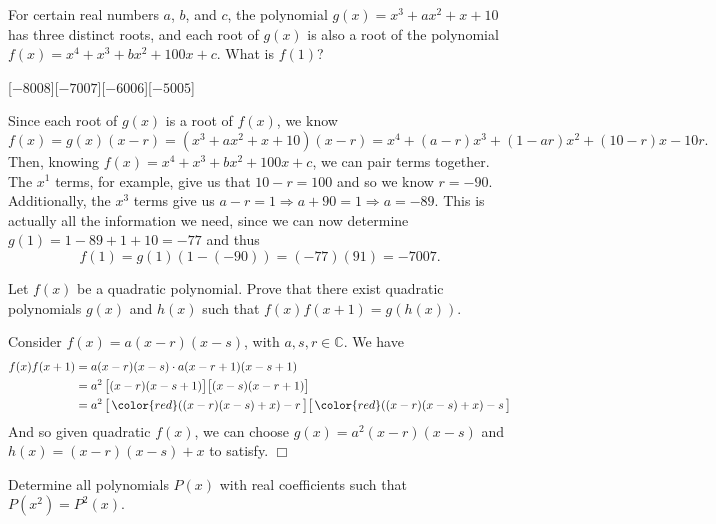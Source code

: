 \begin{problem}[A][5][AMC 12A 2017/23]
    For certain real numbers \( a \), \( b \), and \( c \), the polynomial
    \( g(x) = x^3 + ax^2 + x + 10 \)
    has three distinct roots, and each root of \( g(x) \) is also a root of the polynomial
    \( f(x) = x^4 + x^3 + bx^2 + 100x + c. \)
    What is \( f(1) \)?
\end{problem}
[$-8008$][$-7007$][$-6006$][$-5005$]

\begin{solution}[C]
    Since each root of $g(x)$ is a root of $f(x)$, we know
    \[
        f(x)=g(x)(x-r)=(x^3 + ax^2 + x + 10)(x-r)=x^4+(a-r)x^3+(1-ar)x^2+(10-r)x-10r.
    \]
    Then, knowing $f(x)=x^4 + x^3 + bx^2 + 100x + c$, we can pair terms together. The $x^1$ terms, for example, give us that $10-r=100$ and so we know $r=-90$. Additionally, the $x^3$ terms give us $a-r=1 \Rightarrow a+90=1 \Rightarrow a=-89$. This is actually all the information we need, since we can now determine $g(1)=1-89+1+10=-77$ and thus
    \[
        f(1) = g(1)(1-(-90)) = (-77)(91) = \boxed{-7007}.
    \]
\end{solution}

\begin{problem}
    Let \( f(x) \) be a quadratic polynomial. Prove that there exist quadratic polynomials \( g(x) \) and \( h(x) \) such that \( f(x)f(x+1) = g(h(x)) \).
\end{problem}

\begin{solution}
    Consider $f(x)=a(x-r)(x-s)$, with $a,s,r\in\mathbb{C}$. We have
    \begin{align*}
        f(x)f(x+1)  &=  a(x-r)(x-s)\cdot a(x-r+1)(x-s+1)\\
                    &=  a^2\, \big[(x-r)(x-s+1)\big]\big[(x-s)(x-r+1)\big]\\
                    &=  a^2\,\big[\, {\color{red}((x-r)(x-s)+x)}-r\, \big]\big[\, {\color{red}((x-r)(x-s)+x)}-s\, \big]
    \end{align*}
    And so given quadratic $f(x)$, we can choose $g(x)=a^2(x-r)(x-s)$ and $h(x)=(x-r)(x-s)+x$ to satisfy. $\Box$
\end{solution}

\begin{problem}
    Determine all polynomials \( P(x) \) with real coefficients such that \( P(x^2) = P^2(x) \).
\end{problem}

